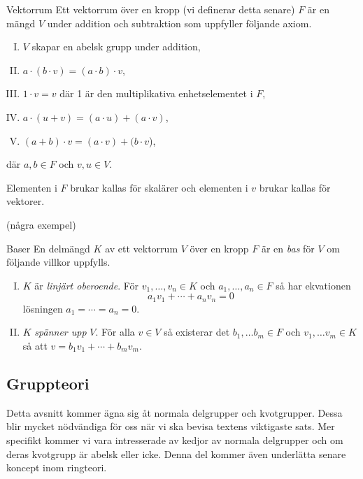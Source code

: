 \documentclass{article}
\theoremstyle{definition}
\begin{document}
\begin{mydef}{Vektorrum}{}
  Ett vektorrum över en kropp (vi definerar detta senare) $F$ är en mängd $V$ under addition och subtraktion som uppfyller följande axiom.
  \begin{enumerate}[I)]
    \item $V$ skapar en abelsk grupp under addition,
    \item $a \cdot (b \cdot v) = (a \cdot b) \cdot v$,
    \item $1 \cdot v = v$ där 1 är den multiplikativa enhetselementet i $F$,
    \item $a \cdot (u + v) = (a \cdot u) + (a \cdot v)$,
    \item $(a + b) \cdot v = (a \cdot v) + (b \cdot v$),
  \end{enumerate}
  där $a, b \in F$ och $v, u \in V$.
\end{mydef}
Elementen i $F$ brukar kallas för skalärer och elementen i $v$ 
brukar kallas för vektorer. 

(några exempel)

\begin{mydef}{Baser}{}
  En delmängd $K$ av ett vektorrum $V$ över en kropp $F$ är en \textit{bas} för $V$ om följande villkor uppfylls.  
  \begin{enumerate}[I)]
    \item $K$ är \textit{linjärt oberoende}. För $v_1, \ldots, v_n \in K$ och $a_1, \ldots, a_n \in F$ så har ekvationen 
    \[a_1v_1 + \cdots + a_n v_n = 0\]
    lösningen $a_1 = \cdots = a_n = 0$.
    \item $K$ \textit{spänner upp} $V$. För alla $v \in V$ så existerar det $b_1, \ldots b_m \in F$ och $v_1, \ldots v_m \in K$ så att 
    $v = b_1 v_1 + \cdots + b_m v_m$.
  \end{enumerate}
\end{mydef}

\subsection{Gruppteori}
Detta avsnitt kommer ägna sig åt normala delgrupper och kvotgrupper. Dessa blir mycket nödvändiga för oss när vi ska bevisa textens viktigaste sats. 
Mer specifikt kommer vi vara intresserade av kedjor av normala delgrupper och om deras kvotgrupp är abelsk eller icke. Denna 
del kommer även underlätta senare koncept inom ringteori.
\end{document}
